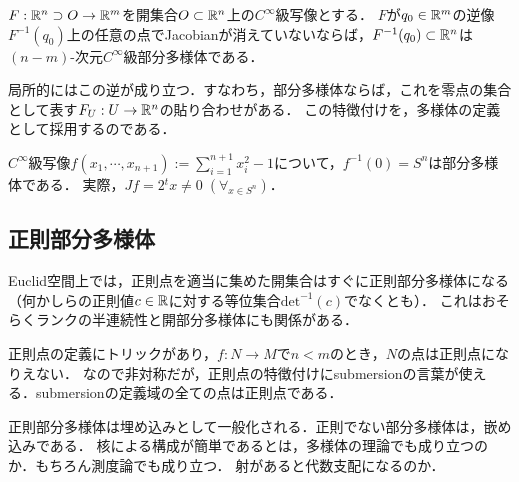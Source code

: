 \documentclass[uplatex,dvipdfmx]{jsreport}
\begin{document}
\begin{corollary}\label{cor-kernel-of-Cinfty-diffeomorphism}
    $F:\mathbb{R}^n\supset O\to\mathbb{R}^m$を開集合$O\subset\mathbb{R}^n$上の$C^\infty$級写像とする．
    $F$が$q_0\in\mathbb{R}^m$の逆像$F^{-1}(q_0)$上の任意の点でJacobianが消えていないならば，$F^{-1}(q_0)\subset\mathbb{R}^n$は$(n-m)$-次元$C^\infty$級部分多様体である．
\end{corollary}
\begin{remarks}
    局所的にはこの逆が成り立つ．すなわち，部分多様体ならば，これを零点の集合として表す$F_U:U\to\mathbb{R}^n$の貼り合わせがある．
    この特徴付けを，多様体の定義として採用するのである．
\end{remarks}
\begin{example}[$n$次元球面]
    $C^\infty$級写像$f(x_1,\cdots,x_{n+1}):=\sum^{n+1}_{i=1}x_i^2-1$について，$f^{-1}(0)=S^n$は部分多様体である．
    実際，$Jf=2{}^t\!x\ne 0\;(\forall_{x\in S^n})$．
\end{example}

\subsection{正則部分多様体}\label{subsection-regular-submanifold}

\begin{tcolorbox}[colframe=ForestGreen, colback=ForestGreen!10!white,breakable,colbacktitle=ForestGreen!40!white,coltitle=black,fonttitle=\bfseries\sffamily,
title=各点でdetが正則点であることさえ確かめれば良いのは，Euclid空間特有の非常に特殊な状況．]
    Euclid空間上では，正則点を適当に集めた開集合はすぐに正則部分多様体になる（何かしらの正則値$c\in\mathbb{R}$に対する等位集合$\mathrm{det}^{-1}(c)$でなくとも）．
    これはおそらくランクの半連続性と開部分多様体にも関係がある．

    正則点の定義にトリックがあり，$f:N\to M$で$n<m$のとき，$N$の点は正則点になりえない．
    なので非対称だが，正則点の特徴付けにsubmersionの言葉が使える．submersionの定義域の全ての点は正則点である．

    正則部分多様体は埋め込みとして一般化される．正則でない部分多様体は，嵌め込みである．
    核による構成が簡単であるとは，多様体の理論でも成り立つのか．もちろん測度論でも成り立つ．
    射があると代数支配になるのか．
\end{tcolorbox}
\end{document}
